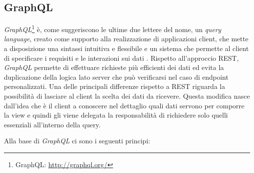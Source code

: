 \begin{table}[ht]
	\caption{Esempio RESTful API}
	\label{table:esempio-rest-api}
	\noindent{}
\end{table}

\subsection{GraphQL\label{sec:graphql-introduzione}}

\emph{GraphQL}\footnote{GraphQL: \url{http://graphql.org/}} è, come suggeriscono le ultime due lettere del nome, un \emph{query language}, creato come supporto alla realizzazione di applicazioni client, che mette a disposizione una sintassi intuitiva e flessibile e un sistema che permette al client di specificare i requisiti e le interazioni sui dati \cite{website:graphql-specs}. Rispetto all'approccio REST, \emph{GraphQL} permette di effettuare richieste più efficienti dei dati ed evita la duplicazione della logica lato server che può verificarsi nel caso di endpoint personalizzati. Una delle principali differenze rispetto a REST riguarda la possibilità di lasciare al client la scelta dei dati da ricevere. Questa modifica nasce dall'idea che è il client a conoscere nel dettaglio quali dati servono per comporre la view e quindi gli viene delegata la responsabilità di richiedere solo quelli essenziali all'interno della query.

Alla base di \emph{GraphQL} ci sono i seguenti principi:

